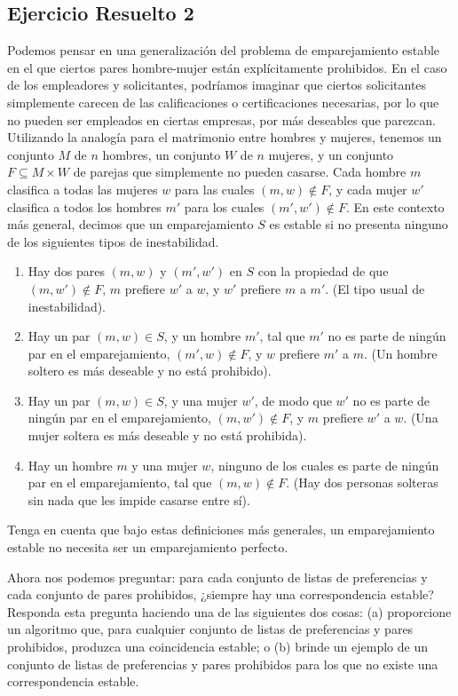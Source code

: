 \documentclass[a4paper, 12pt]{book}
\theoremstyle{dotless}
\begin{document}
\subsection*{Ejercicio Resuelto 2}

Podemos pensar en una generalización del problema de emparejamiento estable en el que ciertos pares hombre-mujer están explícitamente prohibidos. En el caso de los empleadores y solicitantes, podríamos imaginar que ciertos solicitantes simplemente carecen de las calificaciones o certificaciones necesarias, por lo que no pueden ser empleados en ciertas empresas, por más deseables que parezcan. Utilizando la analogía para el matrimonio entre hombres y mujeres, tenemos un conjunto $M$ de $n$ hombres, un conjunto $W$ de $n$ mujeres, y un conjunto $F \subseteq M\times W$ de parejas que simplemente no pueden casarse. Cada hombre $m$ clasifica a todas las mujeres $w$ para las cuales $(m,w) \notin F$, y cada mujer $w'$ clasifica a todos los hombres $m'$ para los cuales $(m',w') \notin F$. En este contexto más general, decimos que un emparejamiento $S$ es estable si no presenta ninguno de los siguientes tipos de inestabilidad.

\begin{enumerate}
    \item Hay dos pares $(m,w)$ y $(m',w')$ en $S$ con la propiedad de que $(m,w') \notin F$, $m$ prefiere $w'$ a $w$, y $w'$ prefiere $m$ a $m'$. (El tipo usual de inestabilidad).
    \item Hay un par $(m,w) \in S$, y un hombre $m'$, tal que $m'$ no es parte de ningún par en el emparejamiento, $(m',w) \notin F$, y $w$ prefiere $m'$ a $m$. (Un hombre soltero es más deseable y no está prohibido).
    \item Hay un par $(m,w) \in S$, y una mujer $w'$, de modo que $w'$ no es parte de ningún par en el emparejamiento, $(m,w') \notin F$, y $m$ prefiere $w'$ a $w$. (Una mujer soltera es más deseable y no está prohibida).
    \item Hay un hombre $m$ y una mujer $w$, ninguno de los cuales es parte de ningún par en el emparejamiento, tal que $(m,w) \notin F$. (Hay dos personas solteras sin nada que les impide casarse entre sí).
\end{enumerate}

Tenga en cuenta que bajo estas definiciones más generales, un emparejamiento estable no necesita ser un emparejamiento perfecto.

Ahora nos podemos preguntar: para cada conjunto de listas de preferencias y cada conjunto de pares prohibidos, ¿siempre hay una correspondencia estable? Responda esta pregunta haciendo una de las siguientes dos cosas: (a) proporcione un algoritmo que, para cualquier conjunto de listas de preferencias y pares prohibidos, produzca una coincidencia estable; o (b) brinde un ejemplo de un conjunto de listas de preferencias y pares prohibidos para los que no existe una correspondencia estable.
\end{document}
